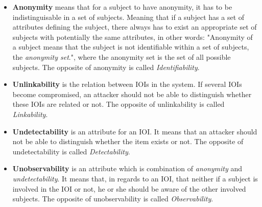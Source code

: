 


\begin{itemize}
\item[] \textbf{Anonymity} means that for a subject to have anonymity, it has to be indistinguisable in a set of subjects. Meaning that if a subject has a set of attributes defining the subject, there always has to exist an appropriate set of subjects with potentially the same attributes, in other words: "Anonymity of a subject means that the subject is not identifiable within a set of subjects, the \textit{anonymity set}.", where the anonymity set is the set of all possible subjects. The opposite of anonymity is called \textit{Identifiability}. 

\item[] \textbf{Unlinkability} is the relation between IOIs in the system. If several IOIs become compromised, an attacker should not be able to distinguish whether these IOIs are related or not. The opposite of unlinkability is called \textit{Linkability}.

\item[] \textbf{Undetectability} is an attribute for an IOI. It means that an attacker should not be able to distinguish whether the item exists or not. The opposite of undetectability is called \textit{Detectability}.

\item[] \textbf{Unobservability} is an attribute which is combination of \textit{anonymity} and \textit{undetectability}. It means that, in regards to an IOI, that neither if a subject is involved in the IOI or not, he or she should be aware of the other involved subjects. The opposite of unobservability is called \textit{Observability}.
\end{itemize}




